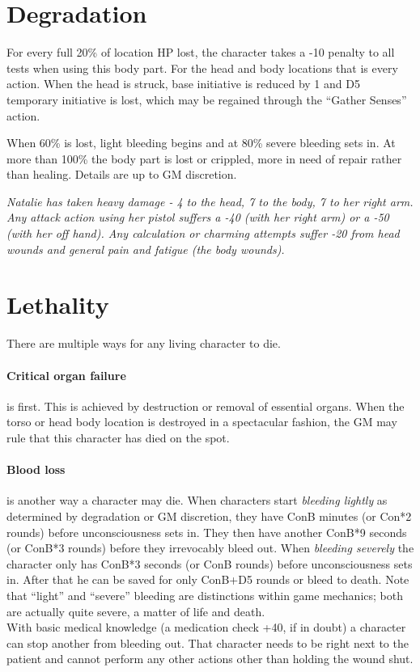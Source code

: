 \documentclass[12pt,a4paper,openany,usenames,dvipsnames]{book}
\begin{document}
	\section{Degradation}
	For every full 20\% of location HP lost, the character takes a -10 penalty to all tests when using this body part. For the head and body locations that is every action.
	When the head is struck, base initiative is reduced by 1 and D5 temporary initiative is lost, which may be regained through the “Gather Senses” action.
	\par
	When 60\% is lost, light bleeding begins and at 80\% severe bleeding sets in. At more than 100\% the body part is lost or crippled, more in need of repair rather than healing. Details are up to GM discretion.
	\begin{exampleblock}
		\itshape
		Natalie has taken heavy damage - 4 to the head, 7 to the body, 7 to her right arm.
		Any attack action using her pistol suffers a -40 (with her right arm) or a -50 (with her off hand).
		Any calculation or charming attempts suffer -20 from head wounds and general pain and fatigue (the body wounds).
	\end{exampleblock}
	
	\section{Lethality}
	\label{sec:lethality}
	There are multiple ways for any living character to die.
	\paragraph{Critical organ failure}is first. This is achieved by destruction or removal of essential organs. When the torso or head body location is destroyed in a spectacular fashion, the GM may rule that this character has died on the spot.
	\paragraph{Blood loss}is another way a character may die. When characters start \emph{bleeding lightly} as determined by degradation or GM discretion, they have ConB minutes (or Con*2 rounds) before unconsciousness sets in.
	They then have another ConB*9 seconds (or ConB*3 rounds) before they irrevocably bleed out. When \emph{bleeding severely} the character only has ConB*3 seconds (or ConB rounds) before unconsciousness sets in.
	After that he can be saved for only ConB+D5 rounds or bleed to death. Note that “light” and “severe” bleeding are distinctions within game mechanics; both are actually quite severe, a matter of life and death.\\
	With basic medical knowledge (a medication check +40, if in doubt) a character can stop another from bleeding out. That character needs to be right next to the patient and cannot perform any other actions other than holding the wound shut.
\end{document}
